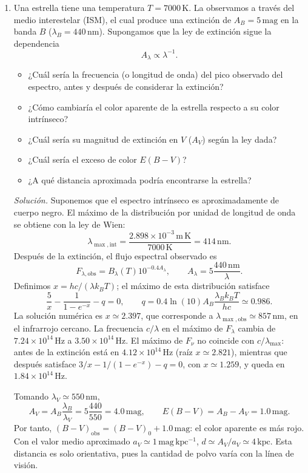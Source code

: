 \documentclass[11pt]{article}
\begin{document}
\begin{enumerate}
    \item Una estrella tiene una temperatura $T = 7000\,\mathrm{K}$. La observamos a través del medio interestelar (ISM), el cual produce una extinción de $A_B = 5\,\mathrm{mag}$ en la banda $B$ ($\lambda_B = 440\,\mathrm{nm}$). Supongamos que la ley de extinción sigue la dependencia
    \[
        A_\lambda \propto \lambda^{-1}.
    \]
    \begin{itemize}
        \item ¿Cuál sería la frecuencia (o longitud de onda) del pico observado del espectro, antes y después de considerar la extinción?
        \item ¿Cómo cambiaría el color aparente de la estrella respecto a su color intrínseco?
        \item ¿Cuál sería su magnitud de extinción en $V$ ($A_V$) según la ley dada?
        \item ¿Cuál sería el exceso de color $E(B - V)$?
        \item ¿A qué distancia aproximada podría encontrarse la estrella?
    \end{itemize}
    \textit{Solución.} Suponemos que el espectro intrínseco es aproximadamente de cuerpo negro. El máximo de la distribución por unidad de longitud de onda se obtiene con la ley de Wien:
    \[
        \lambda_{\max,\mathrm{int}}=\frac{2.898\times10^{-3}\,\mathrm{m\,K}}{7000\,\mathrm{K}}
        =414\,\mathrm{nm}.
    \]
    Después de la extinción, el flujo espectral observado es
    \[
        F_{\lambda,\mathrm{obs}}=B_\lambda(T)10^{-0.4A_\lambda},
        \qquad A_\lambda=5\frac{440\,\mathrm{nm}}{\lambda}.
    \]
    Definimos $x=hc/(\lambda k_BT)$; el máximo de esta distribución satisface
    \[
        \frac{5}{x}-\frac{1}{1-e^{-x}}-q=0,
        \qquad q=0.4\ln(10)A_B\frac{\lambda_B k_BT}{hc}\simeq0.986.
    \]
    La solución numérica es $x\simeq2.397$, que corresponde a $\lambda_{\max,\mathrm{obs}}\simeq857\,\mathrm{nm}$, en el infrarrojo cercano. La frecuencia $c/\lambda$ en el máximo de $F_\lambda$ cambia de $7.24\times10^{14}\,\mathrm{Hz}$ a $3.50\times10^{14}\,\mathrm{Hz}$. El máximo de $F_\nu$ no coincide con $c/\lambda_{\max}$: antes de la extinción está en $4.12\times10^{14}\,\mathrm{Hz}$ (raíz $x\simeq2.821$), mientras que después satisface $3/x-1/(1-e^{-x})-q=0$, con $x\simeq1.259$, y queda en $1.84\times10^{14}\,\mathrm{Hz}$.

    Tomando $\lambda_V\simeq550\,\mathrm{nm}$,
    \[
        A_V=A_B\frac{\lambda_B}{\lambda_V}=5\frac{440}{550}=4.0\,\mathrm{mag},
        \qquad E(B-V)=A_B-A_V=1.0\,\mathrm{mag}.
    \]
    Por tanto, $(B-V)_{\mathrm{obs}}=(B-V)_0+1.0\,\mathrm{mag}$: el color aparente es más rojo. Con el valor medio aproximado $a_V\simeq1\,\mathrm{mag\,kpc^{-1}}$, $d\simeq A_V/a_V\simeq4\,\mathrm{kpc}$. Esta distancia es solo orientativa, pues la cantidad de polvo varía con la línea de visión. \parencite[Secs. 9.4, pp. 286--287; Sec. 10.1, pp. 308--320; Secs. 12.2--12.3.1, pp. 375--385]{chaparro2026}
    \end{enumerate}

\printbibliography[title={Referencias}]
\end{document}
